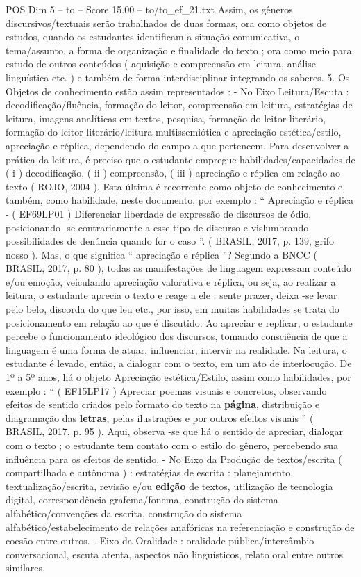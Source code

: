 \begin{textsample}{POS Dim 5 – to – Score 15.00 – to/to\_ef\_21.txt}
Assim, os gêneros discursivos/textuais serão trabalhados de duas formas, ora como objetos de estudos, quando os estudantes identificam a situação comunicativa, o tema/assunto, a forma de organização e finalidade do texto ; ora como meio para estudo de outros conteúdos ( aquisição e compreensão em leitura, análise linguística etc. ) e também de forma interdisciplinar integrando os saberes. 5.
Os Objetos de conhecimento estão assim representados : - No Eixo Leitura/Escuta : decodificação/fluência, formação do leitor, compreensão em leitura, estratégias de leitura, imagens analíticas em textos, pesquisa, formação do leitor literário, formação do leitor literário/leitura multissemiótica e apreciação estética/estilo, apreciação e réplica, dependendo do campo a que pertencem.
Para desenvolver a prática da leitura, é preciso que o estudante empregue habilidades/capacidades de ( i ) decodificação, ( ii ) compreensão, ( iii ) apreciação e réplica em relação ao texto ( ROJO, 2004 ).
Esta última é recorrente como objeto de conhecimento e, também, como habilidade, neste documento, por exemplo : “ Apreciação e réplica - ( EF69LP01 ) Diferenciar liberdade de expressão de discursos de ódio, posicionando -se contrariamente a esse tipo de discurso e vislumbrando possibilidades de denúncia quando for o caso ”. ( BRASIL, 2017, p. 139, grifo nosso ).
Mas, o que significa “ apreciação e réplica ”?
Segundo a BNCC ( BRASIL, 2017, p. 80 ), todas as manifestações de linguagem expressam conteúdo e/ou emoção, veiculando apreciação valorativa e réplica, ou seja, ao realizar a leitura, o estudante aprecia o texto e reage a ele : sente prazer, deixa -se levar pelo belo, discorda do que leu etc., por isso, em muitas habilidades se trata do posicionamento em relação ao que é discutido.
Ao apreciar e replicar, o estudante percebe o funcionamento ideológico dos discursos, tomando consciência de que a linguagem é uma forma de atuar, influenciar, intervir na realidade.
Na leitura, o estudante é levado, então, a dialogar com o texto, em um ato de interlocução.
De 1º a 5º anos, há o objeto Apreciação estética/Estilo, assim como habilidades, por exemplo : “ ( EF15LP17 ) Apreciar poemas visuais e concretos, observando efeitos de sentido criados pelo formato do texto na \textbf{página}, distribuição e diagramação das \textbf{letras}, pelas ilustrações e por outros efeitos visuais ” ( BRASIL, 2017, p. 95 ).
Aqui, observa -se que há o sentido de apreciar, dialogar com o texto ; o estudante tem contato com o estilo do gênero, percebendo sua influência para os efeitos de sentido. - No Eixo da Produção de textos/escrita ( compartilhada e autônoma ) : estratégias de escrita : planejamento, textualização/escrita, revisão e/ou \textbf{edição} de textos, utilização de tecnologia digital, correspondência grafema/fonema, construção do sistema alfabético/convenções da escrita, construção do sistema alfabético/estabelecimento de relações anafóricas na referenciação e construção de coesão entre outros. - Eixo da Oralidade : oralidade pública/intercâmbio conversacional, escuta atenta, aspectos não linguísticos, relato oral entre outros similares.

\end{textsample}
